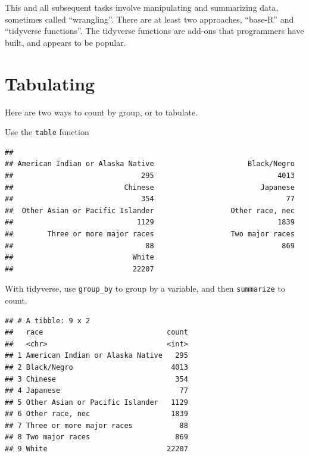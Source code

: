 \documentclass[]{book}
\newenvironment{Shaded}{\begin{snugshade}}{\end{snugshade}}
\newcommand{\KeywordTok}[1]{\textcolor[rgb]{0.13,0.29,0.53}{\textbf{#1}}}
\newcommand{\DataTypeTok}[1]{\textcolor[rgb]{0.13,0.29,0.53}{#1}}
\newcommand{\StringTok}[1]{\textcolor[rgb]{0.31,0.60,0.02}{#1}}
\newcommand{\OperatorTok}[1]{\textcolor[rgb]{0.81,0.36,0.00}{\textbf{#1}}}
\newcommand{\NormalTok}[1]{#1}
\theoremstyle{definition}
\theoremstyle{definition}
\theoremstyle{definition}
\theoremstyle{remark}
\begin{document}
This and all subsequent tasks involve manipulating and summarizing data,
sometimes called ``wrangling''. There are at least two approaches,
``base-R'' and ``tidyverse functions''. The tidyverse functions are
add-ons that programmers have built, and appears to be popular.

\section{Tabulating}\label{tabulating}

Here are two ways to count by group, or to tabulate.

Use the \texttt{table} function

\begin{Shaded}
\end{Shaded}

\begin{verbatim}
## 
## American Indian or Alaska Native                      Black/Negro 
##                              295                             4013 
##                          Chinese                         Japanese 
##                              354                               77 
##  Other Asian or Pacific Islander                  Other race, nec 
##                             1129                             1839 
##        Three or more major races                  Two major races 
##                               88                              869 
##                            White 
##                            22207
\end{verbatim}

With tidyverse, use \texttt{group\_by} to group by a variable, and then
\texttt{summarize} to count.

\begin{Shaded}
\end{Shaded}

\begin{verbatim}
## # A tibble: 9 x 2
##   race                             count
##   <chr>                            <int>
## 1 American Indian or Alaska Native   295
## 2 Black/Negro                       4013
## 3 Chinese                            354
## 4 Japanese                            77
## 5 Other Asian or Pacific Islander   1129
## 6 Other race, nec                   1839
## 7 Three or more major races           88
## 8 Two major races                    869
## 9 White                            22207
\end{verbatim}
\end{document}

